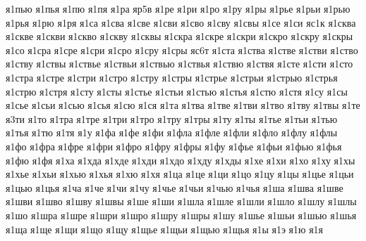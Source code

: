 {я1пью
я1пья
я1пю
я1пя
я1ра
яр5в
я1ре
я1ри
я1ро
я1ру
я1ры
я1рье
я1рьи
я1рью
я1рья
я1рю
я1ря
я1са
я1сва
я1све
я1сви
я1сво
я1сву
я1свы
я1се
я1си
яс1к
я1сква
я1скве
я1скви
я1скво
я1скву
я1сквы
я1скра
я1скре
я1скри
я1скро
я1скру
я1скры
я1со
я1сра
я1сре
я1сри
я1сро
я1сру
я1сры
яс6т
я1ста
я1ства
я1стве
я1стви
я1ство
я1ству
я1ствы
я1ствье
я1ствьи
я1ствью
я1ствья
я1ствю
я1ствя
я1сте
я1сти
я1сто
я1стра
я1стре
я1стри
я1стро
я1стру
я1стры
я1стрье
я1стрьи
я1стрью
я1стрья
я1стрю
я1стря
я1сту
я1сты
я1стье
я1стьи
я1стью
я1стья
я1стю
я1стя
я1су
я1сы
я1сье
я1сьи
я1сью
я1сья
я1сю
я1ся
я1та
я1тва
я1тве
я1тви
я1тво
я1тву
я1твы
я1те
я3ти
я1то
я1тра
я1тре
я1три
я1тро
я1тру
я1тры
я1ту
я1ты
я1тье
я1тьи
я1тью
я1тья
я1тю
я1тя
я1у
я1фа
я1фе
я1фи
я1фла
я1фле
я1фли
я1фло
я1флу
я1флы
я1фо
я1фра
я1фре
я1фри
я1фро
я1фру
я1фры
я1фу
я1фье
я1фьи
я1фью
я1фья
я1фю
я1фя
я1ха
я1хда
я1хде
я1хди
я1хдо
я1хду
я1хды
я1хе
я1хи
я1хо
я1ху
я1хы
я1хье
я1хьи
я1хью
я1хья
я1хю
я1хя
я1ца
я1це
я1ци
я1цо
я1цу
я1цы
я1цье
я1цьи
я1цью
я1цья
я1ча
я1че
я1чи
я1чу
я1чье
я1чьи
я1чью
я1чья
я1ша
я1шва
я1шве
я1шви
я1шво
я1шву
я1швы
я1ше
я1ши
я1шла
я1шле
я1шли
я1шло
я1шлу
я1шлы
я1шо
я1шра
я1шре
я1шри
я1шро
я1шру
я1шры
я1шу
я1шье
я1шьи
я1шью
я1шья
я1ща
я1ще
я1щи
я1що
я1щу
я1щье
я1щьи
я1щью
я1щья
я1ы
я1э
я1ю
я1я
}

